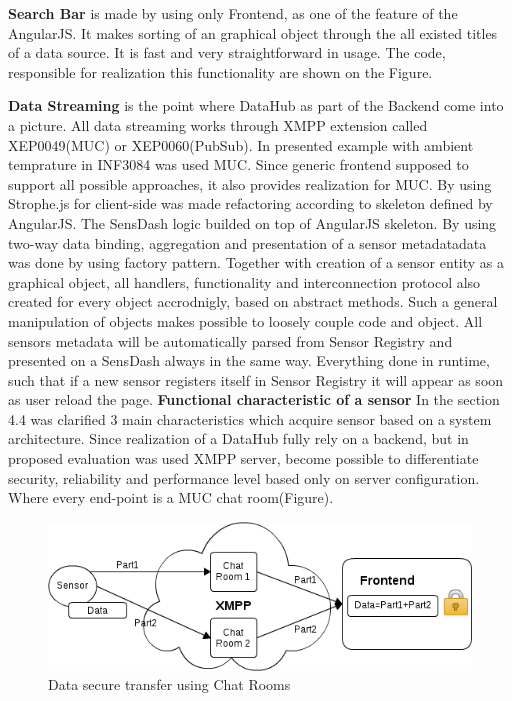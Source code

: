 \textbf{Search Bar} is made by using only Frontend, as one of the feature of the AngularJS. It makes sorting of an graphical object through the all existed titles of a data source. It is fast and very straightforward in usage. The code, responsible for realization this functionality are shown on the Figure.

\textbf{Data Streaming} is the point where DataHub as part of the Backend come into a picture. All data streaming works through XMPP extension called XEP0049(MUC) or XEP0060(PubSub). In presented example with ambient temprature in INF3084 was used MUC. Since generic frontend supposed to support all possible approaches, it also provides realization for MUC. 
By using Strophe.js for client-side was made refactoring according to skeleton defined by AngularJS. 
\newline
The SensDash logic builded on top of AngularJS skeleton. By using two-way data binding, aggregation and presentation of a sensor metadatadata was done by using factory pattern. Together with creation of a sensor entity as a graphical object, all handlers, functionality and interconnection protocol also created for every object accrodnigly, based on abstract methods. Such a general manipulation of objects makes possible to loosely couple code and object. All sensors metadata will be automatically parsed from Sensor Registry and presented on a SensDash always in the same way. Everything done in runtime, such that if a new sensor registers itself in Sensor Registry it will appear as soon as user reload the page. 
\newline
\textbf{Functional characteristic of a sensor}
\newline
In the section 4.4 was clarified 3 main characteristics which acquire sensor based on a system architecture. Since realization of a DataHub fully rely on a backend, but in proposed evaluation was used XMPP server, become possible to differentiate security, reliability and performance level based only on server configuration. Where every end-point is a MUC chat room(Figure). 
\begin{figure}[!ht]
\centering
\includegraphics[scale=0.6]{images/security.png}   
\caption[Security]{Data secure transfer using Chat Rooms}                         
\end{figure}

